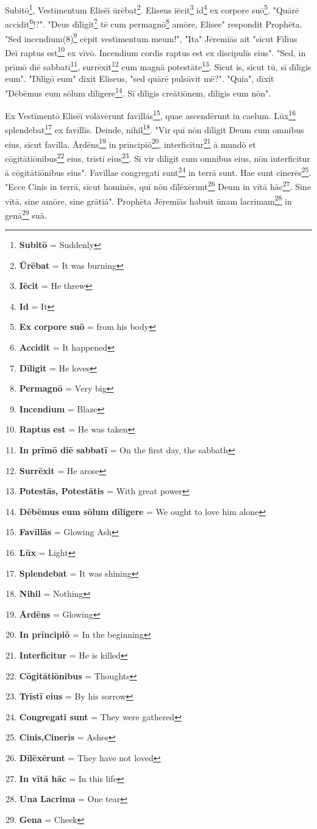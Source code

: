 Subitō\footnote{\textbf{Subitō} = Suddenly}, Vestīmentum Elisēī ūrēbat\footnote{\textbf{Ūrēbat} = It was burning}. Eliseus iēcit\footnote{\textbf{Iēcit} = He threw} id\footnote{\textbf{Id} = It} ex corpore suō\footnote{\textbf{Ex corpore suō} = from his body}. "Quārē accidit\footnote{\textbf{Accidit} = It happened}!?". "Deus dīligit\footnote{\textbf{Dīligit} = He loves} tē cum permagnō\footnote{\textbf{Permagnō} = Very big} amōre, Elisee" respondit Prophēta. "Sed incendium(8)\footnote{\textbf{Incendium} = Blaze} cēpit vestīmentum meum!", "Ita" Jēremīās ait "sīcut Fīlius Deī raptus est\footnote{\textbf{Raptus est} = He was taken} ex vīvō. Incendium cordis raptus est ex discipulīs eius". "Sed, in prīmō diē sabbatī\footnote{\textbf{In prīmō diē sabbatī} = On the first day, the sabbath}, surrēxit\footnote{\textbf{Surrēxit} = He arose} cum magnā potestāte\footnote{\textbf{Potestās, Potestātis} = With great power}. Sīcut is, sīcut tū, sī dīligis eum". "Dīligō eum" dīxit Eliseus, "sed quārē pulsāvit mē?". "Quia", dīxit "Dēbēmus eum sōlum dīligere\footnote{\textbf{Dēbēmus eum sōlum dīligere} = We ought to love him alone}. Sī dīligis creātiōnem, dīligis eum nōn". \par 
Ex Vestīmentō Elisēī volāvērunt favīllās\footnote{\textbf{Favīllās} = Glowing Ash}, quae ascendērunt in caelum. Lūx\footnote{\textbf{Lūx} = Light} splendebat\footnote{\textbf{Splendebat} = It was shining} ex favīllīs. Deinde, nihil\footnote{\textbf{Nihil} = Nothing}. "Vir quī nōn dīligit Deum cum omnibus eius, sīcut favīlla. Ārdēns\footnote{\textbf{Ārdēns} = Glowing} in prīncipiō\footnote{\textbf{In prīncipiō} = In the beginning}, interficitur\footnote{\textbf{Interficitur} = He is killed} ā mundō et cōgitātiōnibus\footnote{\textbf{Cōgitātiōnibus} = Thoughts} eius, trīstī eius\footnote{\textbf{Trīstī eius} = By his sorrow}. Sī vir dīligit cum omnibus eius, nōn interficitur ā cōgitātiōnibus eius". Favīllae congregati sunt\footnote{\textbf{Congregati sunt} = They were gathered} in terrā sunt. Hae sunt cinerēs\footnote{\textbf{Cinis,Cineris} = Ashes}. "Ecce Cinis in terrā, sīcut hominēs, quī nōn dīlēxērunt\footnote{\textbf{Dīlēxērunt} = They have not loved} Deum in vītā hāc\footnote{\textbf{In vītā hāc} = In this life}. Sine vītā, sine amōre, sine grātiā". Prophēta Jēremīās habuit ūnam lacrimam\footnote{\textbf{Una Lacrima} = One tear} in genā\footnote{\textbf{Gena} = Cheek} suā. \par 
